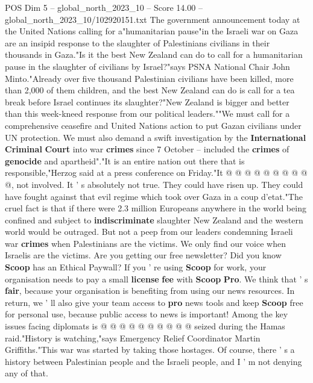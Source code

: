 \begin{textsample}{POS Dim 5 – global\_north\_2023\_10 – Score 14.00 – global\_north\_2023\_10/102920151.txt}  \label{ex:f5_pos_423}
The government announcement today at the United Nations calling for a"humanitarian pause"in the Israeli war on Gaza are an insipid response to the slaughter of Palestinians civilians in their thousands in Gaza."Is it the best New Zealand can do to call for a humanitarian pause in the slaughter of civilians by Israel?"says PSNA National Chair John Minto."Already over five thousand Palestinian civilians have been killed, more than 2,000 of them children, and the best New Zealand can do is call for a tea break before Israel continues its slaughter?"New Zealand is bigger and better than this week-kneed response from our political leaders.""We must call for a comprehensive ceasefire and United Nations action to put Gazan civilians under UN protection.
We must also demand a swift investigation by the \textbf{International} \textbf{Criminal} \textbf{Court} into war \textbf{crimes} since 7 October -- included the \textbf{crimes} of \textbf{genocide} and apartheid"."It is an entire nation out there that is responsible,"Herzog said at a press conference on Friday."It @ @ @ @ @ @ @ @ @ @, not involved.
It ' s absolutely not true.
They could have risen up.
They could have fought against that evil regime which took over Gaza in a coup d'etat."The cruel fact is that if there were 2.3 million Europeans anywhere in the world being confined and subject to \textbf{indiscriminate} slaughter New Zealand and the western world would be outraged.
But not a peep from our leaders condemning Israeli war \textbf{crimes} when Palestinians are the victims.
We only find our voice when Israelis are the victims.
Are you getting our free newsletter?
Did you know \textbf{Scoop} has an Ethical Paywall?
If you ' re using \textbf{Scoop} for work, your organisation needs to pay a small \textbf{license} \textbf{fee} with \textbf{Scoop} \textbf{Pro}.
We think that ' s \textbf{fair}, because your organisation is benefiting from using our news resources.
In return, we ' ll also give your team access to \textbf{pro} news tools and keep \textbf{Scoop} free for personal use, because public access to news is important!
Among the key issues facing diplomats is @ @ @ @ @ @ @ @ @ @ seized during the Hamas raid."History is watching,"says Emergency Relief Coordinator Martin Griffiths."This war was started by taking those hostages.
Of course, there ' s a history between Palestinian people and the Israeli people, and I ' m not denying any of that.

\end{textsample}
